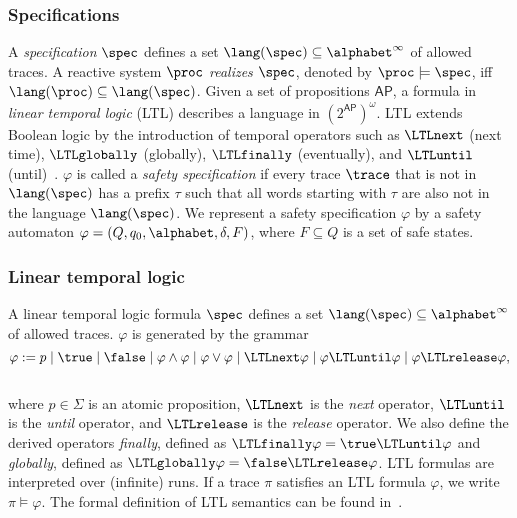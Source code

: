 \subsubsection{Specifications}

A \emph{specification} $\spec$ defines a set $\lang(\spec) \subseteq \alphabet^\infty$ of allowed traces.
%
A reactive system $\proc$ \emph{realizes} $\spec$, denoted by $\proc \models \spec$, iff
$\lang(\proc) \subseteq \lang(\spec)$.
Given a set of propositions $\mathsf{AP}$, a formula in \emph{linear temporal logic} (LTL) describes a language in $(2^\mathsf{AP})^\omega$. LTL extends Boolean logic by the introduction of temporal operators such as $\LTLnext$ (next time), $\LTLglobally$ (globally), $\LTLfinally$ (eventually), and $\LTLuntil$ (until)~\cite{Pnueli77}.
%
$\varphi$ is called a \emph{safety specification} if every trace $\trace$ that is not in  $\lang(\spec)$  has a prefix $\tau$ such that all words starting with $\tau$ are also not in the language $\lang(\spec)$.
We represent a safety specification $\varphi$ by a safety automaton
$\varphi = (Q, q_0, \alphabet, \delta, F)$, where $F\subseteq Q$ is a set of safe states.
\fi

\subsubsection{\textbf{Linear temporal logic}}
A linear temporal logic formula $\spec$ defines a set $\lang(\spec) \subseteq \alphabet^\infty$ of allowed traces. $\varphi$  is generated by the grammar\\
\[\varphi := p \mid \true \mid \false \mid \varphi \wedge \varphi \mid \varphi \vee \varphi \mid \LTLnext  \varphi  \mid \varphi \LTLuntil \varphi \mid \varphi \LTLrelease \varphi,\]\\
where $p \in \Sigma$ is an atomic proposition, $\LTLnext$ is the \emph{next} operator, $\LTLuntil$ is the \emph{until} operator, and $\LTLrelease$ is the \emph{release} operator. We also define the derived operators 
\emph{finally}, defined as $\LTLfinally \varphi = \true \LTLuntil \varphi$ and 
\emph{globally}, defined as $\LTLglobally \varphi = \false \LTLrelease \varphi$.
LTL formulas are interpreted over (infinite) runs. If a trace $\pi$ satisfies an LTL formula $\varphi$, we write $\pi \models \varphi$. The formal definition of LTL semantics can be found in~\cite{BaierKatoen08}.

